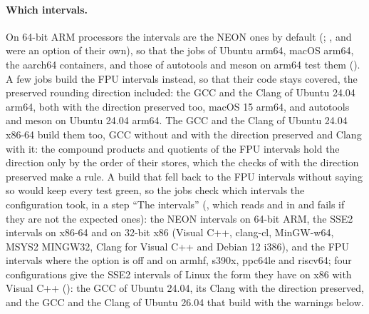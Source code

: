 \paragraph{Which intervals.} On 64-bit ARM processors the intervals are the
NEON ones by default (; ,
 and  were an option of their
own),\newinvfive{} so that the jobs of Ubuntu arm64, macOS arm64, the
aarch64 containers, and those of autotools and meson on arm64 test them
(). A few jobs build the FPU intervals instead, so that
their code stays covered, the preserved rounding direction included: the
GCC and the Clang of Ubuntu 24.04 arm64, both with the direction preserved
too, macOS 15 arm64, and autotools and meson on Ubuntu 24.04 arm64. The GCC
and the Clang of Ubuntu 24.04 x86-64 build them too, GCC without and with
the direction preserved and Clang with it: the compound products and
quotients of the FPU intervals hold the direction only by the order of their
stores, which the checks of  with the direction
preserved make a rule.\newinvfive{} A build that fell back to the FPU
intervals without saying so would keep every test green, so the jobs check
which intervals the configuration took, in a step ``The intervals''
(, which reads
 and
 in
 and
fails if they are not the expected ones): the NEON intervals on 64-bit ARM,
the SSE2 intervals on x86-64 and on 32-bit x86 (Visual C++, clang-cl, MinGW-w64, MSYS2 MINGW32, Clang for Visual C++ and Debian 12 i386), and
the FPU intervals where the option is off and on armhf, s390x, ppc64le and
riscv64; four configurations give the SSE2 intervals of Linux the form they
have on x86 with Visual C++ (): the
GCC of Ubuntu 24.04, its Clang with the direction preserved, and the GCC and
the Clang of Ubuntu 26.04 that build with the warnings below.

